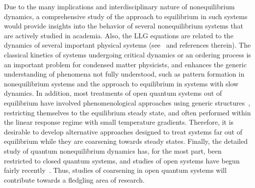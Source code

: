 \documentclass[a4paper,9pt]{article}
\begin{document}
Due to the many implications and interdisciplinary nature of nonequilibrium dynamics, a comprehensive study of the approach to equilibrium in such systems would provide insights into the behavior of several nonequilibrium systems that are actively studied in academia. Also, the LLG equations are related to the dynamics of several important physical systems (see~\cite{gll:review} and references therein). The classical kinetics of systems undergoing critical dynamics or an ordering process is an important problem for condensed matter physicists, and enhances the generic understanding of phenomena not fully understood, such as pattern formation in nonequilibrium systems and the approach to equilibrium in systems with slow dynamics. In addition, most treatments of open quantum systems out of equilibrium have involved phenomenological approaches using generic structures~\cite{openspin}, restricting  themselves to the equilibrium steady state, and often performed within the linear response regime with small temperature gradients. Therefore, it is desirable to develop alternative approaches designed to treat systems far out of equilibrium while they are coarsening towards steady states. Finally, the detailed study of quantum nonequilibrium dynamics has, for the most part, been restricted to closed quantum systems, and studies of open systems have begun fairly recently~\cite{daley}. Thus, studies of coarsening in open quantum systems will contribute towards a fledgling area of research. 
\end{document}
